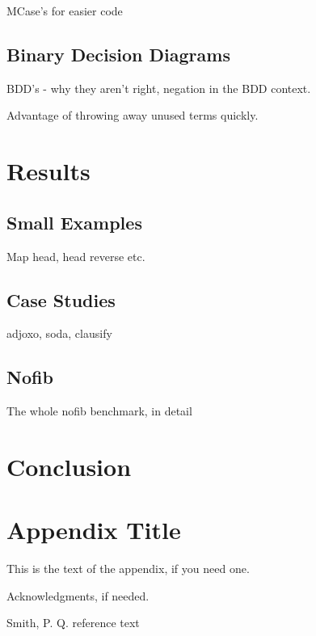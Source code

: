 \documentclass[preprint]{sigplanconf}
\begin{document}
MCase's for easier code

\subsection{Binary Decision Diagrams}

BDD's - why they aren't right, negation in the BDD context.

Advantage of throwing away unused terms quickly.

\section{Results}
\label{chap:results}

\subsection{Small Examples}

Map head, head reverse etc.


\subsection{Case Studies}

adjoxo, soda, clausify

\subsection{Nofib}

The whole nofib benchmark, in detail

\section{Conclusion}
\label{chap:conc}






\appendix
\section{Appendix Title}

This is the text of the appendix, if you need one.

\acks

Acknowledgments, if needed.

\begin{thebibliography}{}

Smith, P. Q. reference text

\end{thebibliography}
\end{document}
